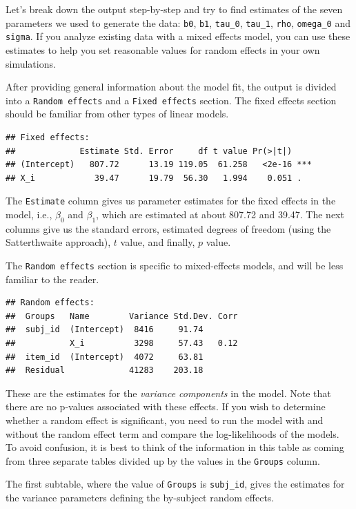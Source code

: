 \documentclass[
  english,
  doc,floatsintext]{apa6}
\begin{document}
\noindent Let's break down the output step-by-step and try to find estimates of the seven parameters we used to generate the data: \texttt{b0}, \texttt{b1}, \texttt{tau\_0}, \texttt{tau\_1}, \texttt{rho}, \texttt{omega\_0} and \texttt{sigma}. If you analyze existing data with a mixed effects model, you can use these estimates to help you set reasonable values for random effects in your own simulations.

After providing general information about the model fit, the output is divided into a \texttt{Random\ effects} and a \texttt{Fixed\ effects} section. The fixed effects section should be familiar from other types of linear models.

\begin{verbatim}
## Fixed effects:
##             Estimate Std. Error     df t value Pr(>|t|)    
## (Intercept)   807.72      13.19 119.05  61.258   <2e-16 ***
## X_i            39.47      19.79  56.30   1.994    0.051 .
\end{verbatim}

\noindent The \texttt{Estimate} column gives us parameter estimates for the fixed effects in the model, i.e., \(\beta_0\) and \(\beta_1\), which are estimated at about 807.72 and 39.47. The next columns give us the standard errors, estimated degrees of freedom (using the Satterthwaite approach), \(t\) value, and finally, \(p\) value.

The \texttt{Random\ effects} section is specific to mixed-effects models, and will be less familiar to the reader.

\begin{verbatim}
## Random effects:
##  Groups   Name        Variance Std.Dev. Corr
##  subj_id  (Intercept)  8416     91.74       
##           X_i          3298     57.43   0.12
##  item_id  (Intercept)  4072     63.81       
##  Residual             41283    203.18
\end{verbatim}

\noindent These are the estimates for the \emph{variance components} in the model. Note that there are no p-values associated with these effects. If you wish to determine whether a random effect is significant, you need to run the model with and without the random effect term and compare the log-likelihoods of the models. To avoid confusion, it is best to think of the information in this table as coming from three separate tables divided up by the values in the \texttt{Groups} column.

The first subtable, where the value of \texttt{Groups} is \texttt{subj\_id}, gives the estimates for the variance parameters defining the by-subject random effects.
\end{document}
